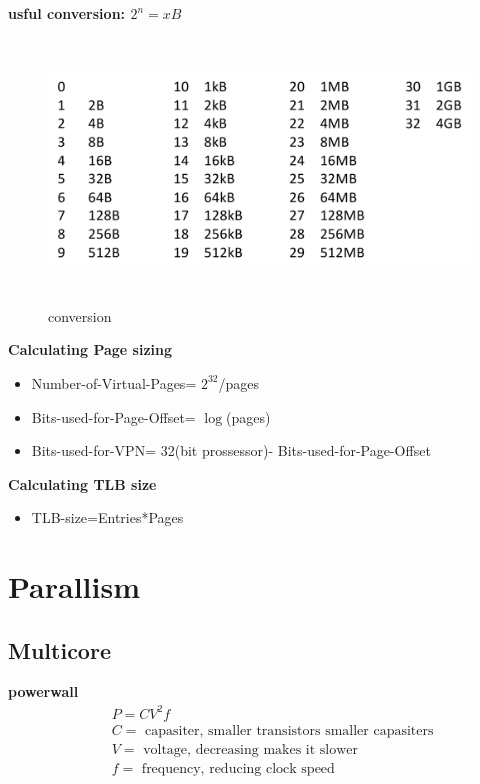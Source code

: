\newpage

\textbf{usful conversion: $2^n=xB$}
\begin{figure}[h]
    \vspace{10mm}
    \centering
    \includegraphics[width=16cm, height=7cm]{image/conversion.png}
    \caption{conversion}
\end{figure}


\textbf{Calculating Page sizing}
\begin{itemize}
\item  Number-of-Virtual-Pages= $2^{32}$/pages
\item  Bits-used-for-Page-Offset= $\log$(pages)
\item  Bits-used-for-VPN= 32(bit prossessor)- Bits-used-for-Page-Offset
\end{itemize}

\textbf{Calculating TLB size}
\begin{itemize}
\item  TLB-size=Entries*Pages
\end{itemize}


\newpage


\section{Parallism}

\subsection{Multicore}
\textbf{powerwall}
\begin{align*}
  &\quad P=CV^2f \\
  &\quad C= \text{ capasiter, smaller transistors smaller capasiters} \\
  &\quad V= \text{ voltage, decreasing makes it slower} \\
  &\quad f= \text{ frequency, reducing clock speed} \\
\end{align*}

